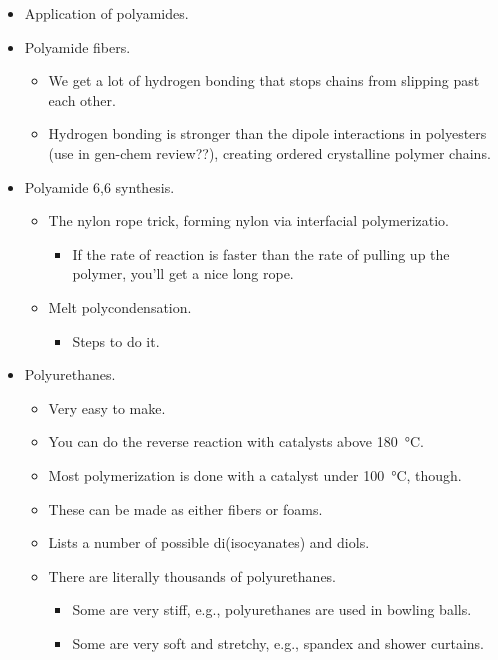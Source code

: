 \documentclass[../notes.tex]{subfiles}
\begin{document}
\begin{itemize}
    \item Application of polyamides.
    \item Polyamide fibers.
    \begin{itemize}
        \item We get a lot of hydrogen bonding that stops chains from slipping past each other.
        \item Hydrogen bonding is stronger than the dipole interactions in polyesters (use in gen-chem review??), creating ordered crystalline polymer chains.
    \end{itemize}
    \item Polyamide 6,6 synthesis.
    \begin{itemize}
        \item The nylon rope trick, forming nylon via interfacial polymerizatio.
        \begin{itemize}
            \item If the rate of reaction is faster than the rate of pulling up the polymer, you'll get a nice long rope.
        \end{itemize}
        \item Melt polycondensation.
        \begin{itemize}
            \item Steps to do it.
        \end{itemize}
    \end{itemize}
    \item Polyurethanes.
    \begin{itemize}
        \item Very easy to make.
        \item You can do the reverse reaction with catalysts above \SI{180}{\celsius}.
        \item Most polymerization is done with a catalyst under \SI{100}{\celsius}, though.
        \item These can be made as either fibers or foams.
        \item Lists a number of possible di(isocyanates) and diols.
        \item There are literally thousands of polyurethanes.
        \begin{itemize}
            \item Some are very stiff, e.g., polyurethanes are used in bowling balls.
            \item Some are very soft and stretchy, e.g., spandex and shower curtains.
        \end{itemize}

\end{itemize}
\end{itemize}
\end{document}
